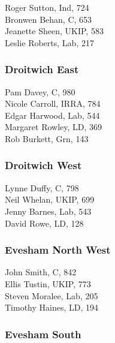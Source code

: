 \documentclass[a4paper,openany,10pt]{book}
\begin{document}


Roger Sutton, Ind, 724\\
Bronwen Behan, C, 653\\
Jeanette Sheen, UKIP, 583\\
Leslie Roberts, Lab, 217\\


\subsubsection*{Droitwich East}



Pam Davey, C, 980\\
Nicole Carroll, IRRA, 784\\
Edgar Harwood, Lab, 544\\
Margaret Rowley, LD, 369\\
Rob Burkett, Grn, 143\\


\subsubsection*{Droitwich West}



Lynne Duffy, C, 798\\
Neil Whelan, UKIP, 699\\
Jenny Barnes, Lab, 543\\
David Rowe, LD, 128\\


\subsubsection*{Evesham North West}



John Smith, C, 842\\
Ellis Tustin, UKIP, 773\\
Steven Moralee, Lab, 205\\
Timothy Haines, LD, 194\\


\subsubsection*{Evesham South}
\end{document}
